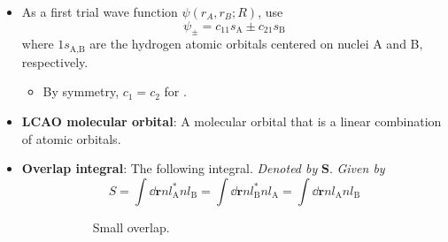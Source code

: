 \documentclass[../notes.tex]{subfiles}
\begin{document}
\begin{itemize}
\begin{itemize}
    \end{itemize}
    \item As a first trial wave function $\psi(r_A,r_B;R)$, use
    \begin{equation*}
        \psi_\pm = c_11s_\text{A}\pm c_21s_\text{B}
    \end{equation*}
    where $1s_\text{A,B}$ are the hydrogen atomic orbitals centered on nuclei A and B, respectively.
    \begin{itemize}
        \item By symmetry, $c_1=c_2$ for .
    \end{itemize}
    \item \textbf{LCAO molecular orbital}: A molecular orbital that is a linear combination of atomic orbitals.
    \item \textbf{Overlap integral}: The following integral. \emph{Denoted by} $\bm{S}$. \emph{Given by}
    \begin{equation*}
        S = \int\dd{\mathbf{r}}nl_\text{A}^*nl_\text{B}
        = \int\dd{\mathbf{r}}nl_\text{B}^*nl_\text{A}
        = \int\dd{\mathbf{r}}nl_\text{A}nl_\text{B}
    \end{equation*}
    \begin{figure}[h!]
        \centering
        \begin{subfigure}[b]{0.4\linewidth}
            \centering
            \caption{Small overlap.}
            \label{fig:overlapIntegrala}
        \end{subfigure}
        \begin{subfigure}[b]{0.4\linewidth}
            \centering
\end{subfigure}
\end{figure}
\end{itemize}
\end{document}
